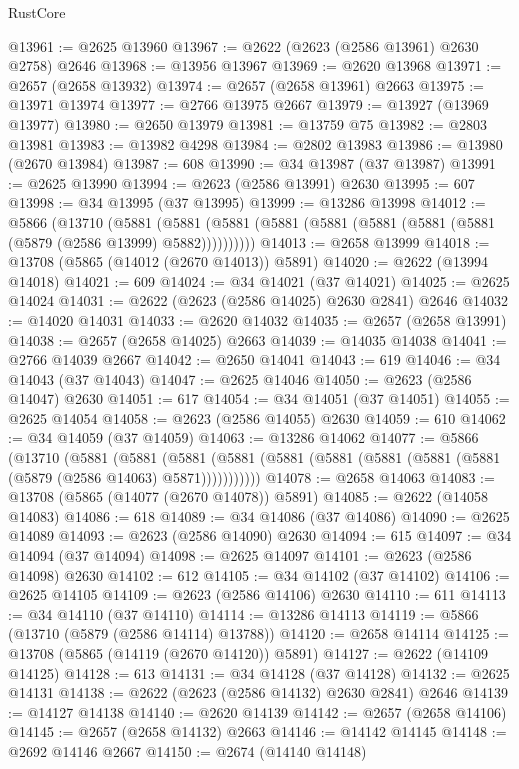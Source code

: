 \begin{lexlean}{RustCore}
\begin{coremodule}
@13961 := @2625 @13960
@13967 := @2622 (@2623 (@2586 @13961) @2630 @2758) @2646
@13968 := @13956 @13967
@13969 := @2620 @13968
@13971 := @2657 (@2658 @13932)
@13974 := @2657 (@2658 @13961) @2663
@13975 := @13971 @13974
@13977 := @2766 @13975 @2667
@13979 := @13927 (@13969 @13977)
@13980 := @2650 @13979
@13981 := @13759 @75
@13982 := @2803 @13981
@13983 := @13982 @4298
@13984 := @2802 @13983
@13986 := @13980 (@2670 @13984)
@13987 := 608
@13990 := @34 @13987 (@37 @13987)
@13991 := @2625 @13990
@13994 := @2623 (@2586 @13991) @2630
@13995 := 607
@13998 := @34 @13995 (@37 @13995)
@13999 := @13286 @13998
@14012 := @5866
    (@13710
      (@5881 (@5881 (@5881 (@5881 (@5881 (@5881 (@5881 (@5881 (@5879 (@2586 @13999) @5882))))))))))
@14013 := @2658 @13999
@14018 := @13708 (@5865 (@14012 (@2670 @14013)) @5891)
@14020 := @2622 (@13994 @14018)
@14021 := 609
@14024 := @34 @14021 (@37 @14021)
@14025 := @2625 @14024
@14031 := @2622 (@2623 (@2586 @14025) @2630 @2841) @2646
@14032 := @14020 @14031
@14033 := @2620 @14032
@14035 := @2657 (@2658 @13991)
@14038 := @2657 (@2658 @14025) @2663
@14039 := @14035 @14038
@14041 := @2766 @14039 @2667
@14042 := @2650 @14041
@14043 := 619
@14046 := @34 @14043 (@37 @14043)
@14047 := @2625 @14046
@14050 := @2623 (@2586 @14047) @2630
@14051 := 617
@14054 := @34 @14051 (@37 @14051)
@14055 := @2625 @14054
@14058 := @2623 (@2586 @14055) @2630
@14059 := 610
@14062 := @34 @14059 (@37 @14059)
@14063 := @13286 @14062
@14077 := @5866
    (@13710
      (@5881
        (@5881
          (@5881 (@5881 (@5881 (@5881 (@5881 (@5881 (@5881 (@5879 (@2586 @14063) @5871)))))))))))
@14078 := @2658 @14063
@14083 := @13708 (@5865 (@14077 (@2670 @14078)) @5891)
@14085 := @2622 (@14058 @14083)
@14086 := 618
@14089 := @34 @14086 (@37 @14086)
@14090 := @2625 @14089
@14093 := @2623 (@2586 @14090) @2630
@14094 := 615
@14097 := @34 @14094 (@37 @14094)
@14098 := @2625 @14097
@14101 := @2623 (@2586 @14098) @2630
@14102 := 612
@14105 := @34 @14102 (@37 @14102)
@14106 := @2625 @14105
@14109 := @2623 (@2586 @14106) @2630
@14110 := 611
@14113 := @34 @14110 (@37 @14110)
@14114 := @13286 @14113
@14119 := @5866 (@13710 (@5879 (@2586 @14114) @13788))
@14120 := @2658 @14114
@14125 := @13708 (@5865 (@14119 (@2670 @14120)) @5891)
@14127 := @2622 (@14109 @14125)
@14128 := 613
@14131 := @34 @14128 (@37 @14128)
@14132 := @2625 @14131
@14138 := @2622 (@2623 (@2586 @14132) @2630 @2841) @2646
@14139 := @14127 @14138
@14140 := @2620 @14139
@14142 := @2657 (@2658 @14106)
@14145 := @2657 (@2658 @14132) @2663
@14146 := @14142 @14145
@14148 := @2692 @14146 @2667
@14150 := @2674 (@14140 @14148)

\end{coremodule}
\end{lexlean}
